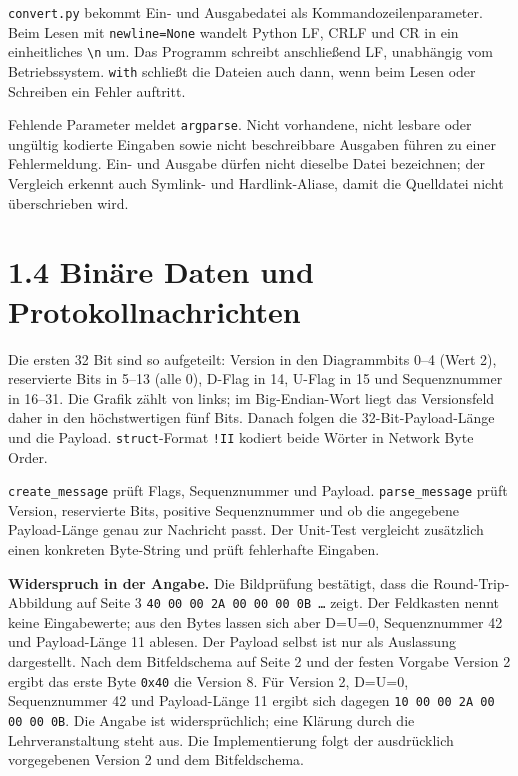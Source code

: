 \documentclass[10pt,a4paper]{article}
\begin{document}
\verb|convert.py| bekommt Ein- und Ausgabedatei als Kommandozeilenparameter. Beim Lesen mit \verb|newline=None| wandelt Python LF, CRLF und CR in ein einheitliches \verb|\n| um. Das Programm schreibt anschließend LF, unabhängig vom Betriebssystem. \verb|with| schließt die Dateien auch dann, wenn beim Lesen oder Schreiben ein Fehler auftritt.

Fehlende Parameter meldet \texttt{argparse}. Nicht vorhandene, nicht lesbare oder ungültig kodierte Eingaben sowie nicht beschreibbare Ausgaben führen zu einer Fehlermeldung. Ein- und Ausgabe dürfen nicht dieselbe Datei bezeichnen; der Vergleich erkennt auch Symlink- und Hardlink-Aliase, damit die Quelldatei nicht überschrieben wird.

\newpage
\section*{1.4 Binäre Daten und Protokollnachrichten}

\begin{samepage}
Die ersten 32 Bit sind so aufgeteilt: Version in den Diagrammbits 0--4 (Wert 2), reservierte Bits in 5--13 (alle 0), D-Flag in 14, U-Flag in 15 und Sequenznummer in 16--31. Die Grafik zählt von links; im Big-Endian-Wort liegt das Versionsfeld daher in den höchstwertigen fünf Bits. Danach folgen die 32-Bit-Payload-Länge und die Payload. \texttt{struct}-Format \texttt{!II} kodiert beide Wörter in Network Byte Order.
\end{samepage}

\texttt{create\_message} prüft Flags, Sequenznummer und Payload. \texttt{parse\_message} prüft Version, reservierte Bits, positive Sequenznummer und ob die angegebene Payload-Länge genau zur Nachricht passt. Der Unit-Test vergleicht zusätzlich einen konkreten Byte-String und prüft fehlerhafte Eingaben.

\smallskip
\textbf{Widerspruch in der Angabe.} Die Bildprüfung bestätigt, dass die Round-Trip-Abbildung auf Seite 3 \texttt{40 00 00 2A 00 00 00 0B \ldots} zeigt. Der Feldkasten nennt keine Eingabewerte; aus den Bytes lassen sich aber D=U=0, Sequenznummer 42 und Payload-Länge 11 ablesen. Der Payload selbst ist nur als Auslassung dargestellt. Nach dem Bitfeldschema auf Seite 2 und der festen Vorgabe Version 2 ergibt das erste Byte \texttt{0x40} die Version 8. Für Version 2, D=U=0, Sequenznummer 42 und Payload-Länge 11 ergibt sich dagegen \texttt{10 00 00 2A 00 00 00 0B}. Die Angabe ist widersprüchlich; eine Klärung durch die Lehrveranstaltung steht aus. Die Implementierung folgt der ausdrücklich vorgegebenen Version 2 und dem Bitfeldschema.
\end{document}
